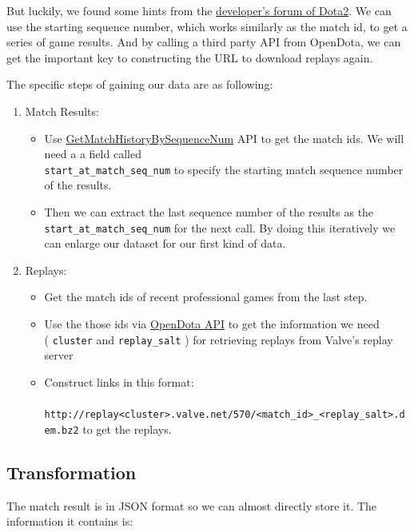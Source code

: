 \documentclass{article}
\newcommand{\codeinline}[1]{
	\texttt{#1}
}
\begin{document}
But luckily, we found some hints from the \href{https://dev.dota2.com}{developer's forum of Dota2}.
We can use the starting sequence number, which works similarly as the match id, to get a series of game results.
And by calling a third party API from OpenDota, we can get the important key to constructing the URL to download replays again.

The specific steps of gaining our data are as following:

\begin{enumerate}
\item Match Results:
	\begin{itemize}
		\item Use \href{https://wiki.teamfortress.com/wiki/WebAPI/GetMatchHistoryBySequenceNum}{GetMatchHistoryBySequenceNum} API to get the match ids. We will need a a field called \\ \codeinline{start_at_match_seq_num} to specify the starting match sequence number of the results.
		\item Then we can extract the last sequence number of the results as the \codeinline{start_at_match_seq_num} for the next call. By doing this iteratively we can enlarge our dataset for our first kind of data.
	\end{itemize}
\item Replays:
	\begin{itemize}
		\item Get the match ids of recent professional games from the last step.
		\item Use the those ids via \href{https://docs.opendota.com/#tag/matches}{OpenDota API} to get the information we need \\ (\codeinline{cluster} and \codeinline{replay_salt}) for retrieving replays from Valve's replay server
		\item Construct links in this format:\\  \codeinline{ http://replay<cluster>.valve.net/570/<match_id>_<replay_salt>.dem.bz2} to get the replays.
	\end{itemize}
\end{enumerate}


\subsection{Transformation}

The match result is in JSON format so we can almost directly store it. The information it contains is:
\end{document}
